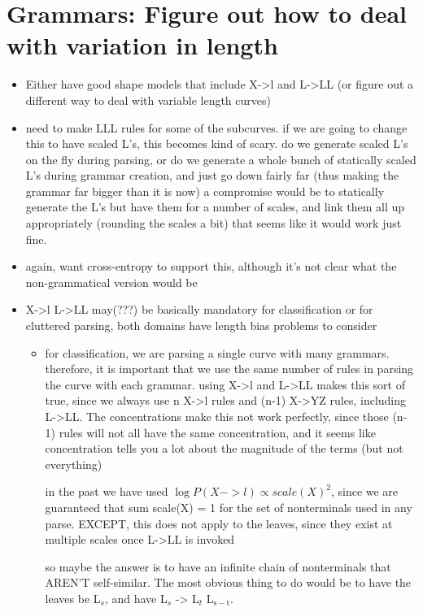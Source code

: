\documentclass{book}
\begin{document}
\section{Grammars: Figure out how to deal with variation in length}
\label{sec-5_13}

\begin{itemize}
\item Either have good shape models that include X->l and L->LL (or
    figure out a different way to deal with variable length curves)
\item need to make LLL rules for some of the subcurves. if we are going
    to change this to have scaled L's, this becomes kind of scary. do
    we generate scaled L's on the fly during parsing, or do we
    generate a whole bunch of statically scaled L's during grammar
    creation, and just go down fairly far (thus making the grammar far
    bigger than it is now) a compromise would be to statically
    generate the L's but have them for a number of scales, and link
    them all up appropriately (rounding the scales a bit) that seems
    like it would work just fine.
\item again, want cross-entropy to support this, although it's not
    clear what the non-grammatical version would be
\item X->l L->LL may(???) be basically mandatory for classification or for
    cluttered parsing, both domains have length bias problems to
    consider

\begin{itemize}
\item for classification, we are parsing a single curve with many
      grammars. therefore, it is important that we use the same number
      of rules in parsing the curve with each grammar. using X->l and
      L->LL makes this sort of true, since we always use n X->l rules
      and (n-1) X->YZ rules, including L->LL. The concentrations make
      this not work perfectly, since those (n-1) rules will not all
      have the same concentration, and it seems like concentration
      tells you a lot about the magnitude of the terms (but not
      everything)

      in the past we have used $\log P(X->l) \propto scale(X)^2$, since
      we are guaranteed that sum scale(X) = 1 for the set of
      nonterminals used in any parse. EXCEPT, this does not apply to
      the leaves, since they exist at multiple scales once L->LL is
      invoked

      so maybe the answer is to have an infinite chain of nonterminals
      that AREN'T self-similar. The most obvious thing to do would be
      to have the leaves be L$_s$, and have L$_s$ -> L$_t$ L$_{\mathrm{s-t}}$.


\end{itemize}
\end{itemize}
\end{document}
